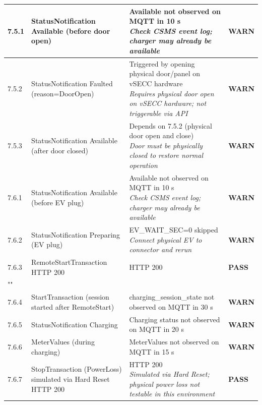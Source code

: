\documentclass[10pt, a4paper]{article}
\begin{document}
\begin{longtable}{|L{1cm}|L{5.5cm}|M{7cm}|C{1.8cm}|}
\hline
\small 7.5.1 & \small StatusNotification Available (before door open) & Available not observed on MQTT in 10 s{\newline\normalfont\footnotesize\itshape Check CSMS event log; charger may already be available} & \textcolor{warnorange}{\textbf{WARN}} \\
\hline
\small 7.5.2 & \small StatusNotification Faulted (reason=DoorOpen) & Triggered by opening physical door/panel on vSECC hardware{\newline\normalfont\footnotesize\itshape Requires physical door open on vSECC hardware; not triggerable via API} & \textcolor{warnorange}{\textbf{WARN}} \\
\hline
\small 7.5.3 & \small StatusNotification Available (after door closed) & Depends on 7.5.2 (physical door open and close){\newline\normalfont\footnotesize\itshape Door must be physically closed to restore normal operation} & \textcolor{warnorange}{\textbf{WARN}} \\
\hline
\small 7.6.1 & \small StatusNotification Available (before EV plug) & Available not observed on MQTT in 10 s{\newline\normalfont\footnotesize\itshape Check CSMS event log; charger may already be available} & \textcolor{warnorange}{\textbf{WARN}} \\
\hline
\small 7.6.2 & \small StatusNotification Preparing (EV plug) & EV\_WAIT\_SEC=0  skipped{\newline\normalfont\footnotesize\itshape Connect physical EV to connector and rerun} & \textcolor{warnorange}{\textbf{WARN}} \\
\hline
\small 7.6.3 & \small RemoteStartTransaction  HTTP 200 & HTTP 200 & \textcolor{passgreen}{\textbf{PASS}} \\
\hline
{} \\
\hline
\small 7.6.4 & \small StartTransaction (session started after RemoteStart) & charging\_session\_state not observed on MQTT in 30 s & \textcolor{warnorange}{\textbf{WARN}} \\
\hline
\small 7.6.5 & \small StatusNotification Charging & Charging status not observed on MQTT in 20 s & \textcolor{warnorange}{\textbf{WARN}} \\
\hline
\small 7.6.6 & \small MeterValues (during charging) & MeterValues not observed on MQTT in 15 s & \textcolor{warnorange}{\textbf{WARN}} \\
\hline
\small 7.6.7 & \small StopTransaction (PowerLoss)  simulated via Hard Reset  HTTP 200 & HTTP 200{\newline\normalfont\footnotesize\itshape Simulated via Hard Reset; physical power loss not testable in this environment} & \textcolor{passgreen}{\textbf{PASS}} \\

\end{longtable}
\end{document}
